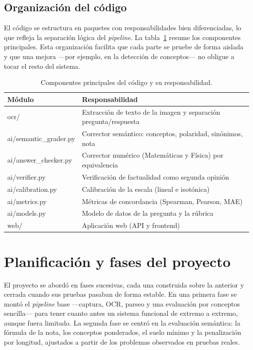 \subsection{Organización del código}

El código se estructura en paquetes con responsabilidades bien diferenciadas, lo que refleja la separación lógica del \emph{pipeline}. La tabla~\ref{tab:modulos} resume los componentes principales. Esta organización facilita que cada parte se pruebe de forma aislada y que una mejora —por ejemplo, en la detección de conceptos— no obligue a tocar el resto del sistema.

\begin{table}[ht]
\centering
\caption{Componentes principales del código y su responsabilidad.}
\label{tab:modulos}
\small
\begin{tabularx}{\textwidth}{>{\ttfamily}l >{\raggedright\arraybackslash}X}
\toprule
\normalfont Módulo & Responsabilidad \\
\midrule
ocr/ & Extracción de texto de la imagen y separación pregunta/respuesta \\
ai/semantic\_grader.py & Corrector semántico: conceptos, polaridad, sinónimos, nota \\
ai/answer\_checker.py & Corrector numérico (Matemáticas y Física) por equivalencia \\
ai/verifier.py & Verificación de factualidad como segunda opinión \\
ai/calibration.py & Calibración de la escala (lineal e isotónica) \\
ai/metrics.py & Métricas de concordancia (Spearman, Pearson, MAE) \\
ai/models.py & Modelo de datos de la pregunta y la rúbrica \\
web/ & Aplicación web (API y frontend) \\
\bottomrule
\end{tabularx}
\end{table}

\section{Planificación y fases del proyecto}

El proyecto se abordó en fases sucesivas, cada una construida sobre la anterior y cerrada cuando sus pruebas pasaban de forma estable. En una primera fase se montó el \emph{pipeline} base —captura, OCR, parseo y una evaluación por conceptos sencilla— para tener cuanto antes un sistema funcional de extremo a extremo, aunque fuera limitado. La segunda fase se centró en la evaluación semántica: la fórmula de la nota, los conceptos ponderados, el suelo mínimo y la penalización por longitud, ajustados a partir de los problemas observados en pruebas reales.

